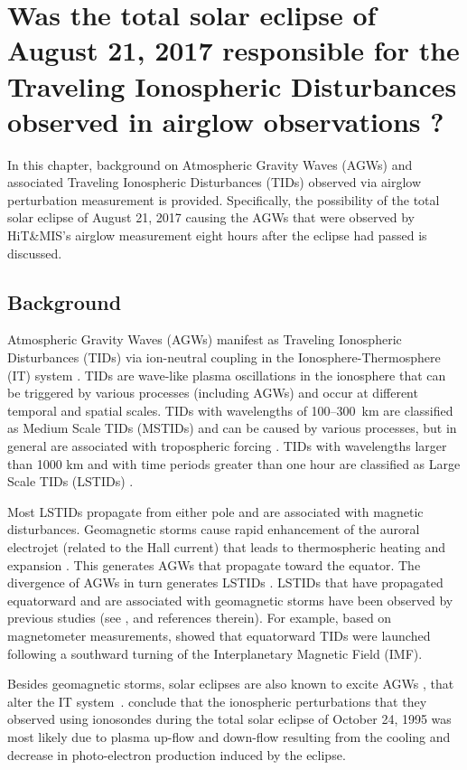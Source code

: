 \documentclass[crop=false,class=mitthesis,oneside,font=12pt]{standalone}
\begin{document}
\chapter{Was the total solar eclipse of August 21, 2017 responsible for the Traveling Ionospheric Disturbances observed in airglow observations ?}
In this chapter, background on Atmospheric Gravity Waves (AGWs) and associated Traveling Ionospheric Disturbances (TIDs) observed via airglow perturbation measurement is provided. Specifically, the possibility of the total solar eclipse of August 21, 2017 causing the AGWs that were observed by HiT\&MIS's airglow measurement eight hours after the eclipse had passed is discussed. 
\section{Background} 

Atmospheric Gravity Waves (AGWs) manifest as Traveling Ionospheric Disturbances (TIDs) via ion-neutral coupling in the Ionosphere-Thermosphere (IT) system \citep{hines_1960}. TIDs are wave-like plasma oscillations in the ionosphere that can be triggered by various processes (including AGWs) and occur at different temporal and spatial scales. TIDs with wavelengths of 100--300~km are classified as Medium Scale TIDs (MSTIDs) and can be caused by various processes, but in general are associated with tropospheric forcing \citep{kelley}. TIDs with wavelengths larger than 1000 km and with time periods greater than one hour are classified as Large Scale TIDs (LSTIDs) \citep{hocke1996review}.

Most LSTIDs propagate from either pole and are associated with magnetic disturbances. Geomagnetic storms cause rapid enhancement of the auroral electrojet (related to the Hall current) that leads to thermospheric heating and expansion \citep{davis_polar_1971,chimonas_atmospheric_1970}. This generates AGWs that propagate toward the equator. The divergence of AGWs in turn generates LSTIDs \citep{prolss_lstid_2000}. LSTIDs that have propagated equatorward and are associated with geomagnetic storms have been observed by previous studies (see \citet{habarulema_storm_tid}, and references therein). For example, based on magnetometer measurements, \citet{habarulema_storm_tid} showed that equatorward TIDs were launched following a southward turning of the Interplanetary Magnetic Field (IMF).

Besides geomagnetic storms, solar eclipses are also known to excite AGWs \citep[e.g.,][]{liu_1998, chimonas1970}, that alter the  IT system~\citep{Lin2018,harding_nightside_eclipse}. \citet{liu_1998} conclude that the ionospheric perturbations that they observed using ionosondes during the total solar eclipse of October 24, 1995 was most likely due to plasma up-flow and down-flow resulting from the cooling and decrease in photo-electron production induced by the eclipse.
\end{document}
